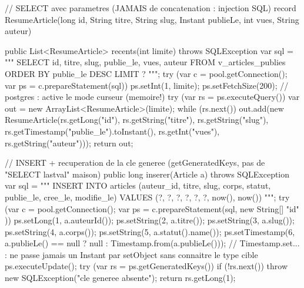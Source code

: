\documentclass[12pt,a4paper,twoside,openright]{book}
\begin{document}
\begin{codejava}
// SELECT avec parametres (JAMAIS de concatenation : injection SQL)
record ResumeArticle(long id, String titre, String slug, Instant publieLe, int vues, String auteur) { }

public List<ResumeArticle> recents(int limite) throws SQLException {
    var sql = """
            SELECT id, titre, slug, publie_le, vues, auteur
            FROM   v_articles_publies
            ORDER  BY publie_le DESC
            LIMIT  ?
            """;
    try (var c = pool.getConnection();
         var ps = c.prepareStatement(sql)) {
        ps.setInt(1, limite);
        ps.setFetchSize(200);                       // postgres : active le mode curseur (memoire!)
        try (var rs = ps.executeQuery()) {
            var out = new ArrayList<ResumeArticle>(limite);
            while (rs.next()) {
                out.add(new ResumeArticle(rs.getLong("id"), rs.getString("titre"), rs.getString("slug"),
                        rs.getTimestamp("publie_le").toInstant(), rs.getInt("vues"), rs.getString("auteur")));
            }
            return out;
        }
    }
}

// INSERT + recuperation de la cle generee (getGeneratedKeys, pas de "SELECT lastval" maison)
public long inserer(Article a) throws SQLException {
    var sql = """
            INSERT INTO articles (auteur_id, titre, slug, corps, statut, publie_le, cree_le, modifie_le)
            VALUES (?, ?, ?, ?, ?, ?, now(), now())
            """;
    try (var c = pool.getConnection();
         var ps = c.prepareStatement(sql, new String[] { "id" })) {
        ps.setLong(1, a.auteurId());
        ps.setString(2, a.titre());
        ps.setString(3, a.slug());
        ps.setString(4, a.corps());
        ps.setString(5, a.statut().name());
        ps.setTimestamp(6, a.publieLe() == null ? null : Timestamp.from(a.publieLe()));
        // Timestamp.set... : ne passe jamais un Instant par setObject sans connaitre le type cible
        ps.executeUpdate();
        try (var rs = ps.getGeneratedKeys()) {
            if (!rs.next()) { throw new SQLException("cle generee absente"); }
            return rs.getLong(1);
        }
    }
}


\end{codejava}
\end{document}
